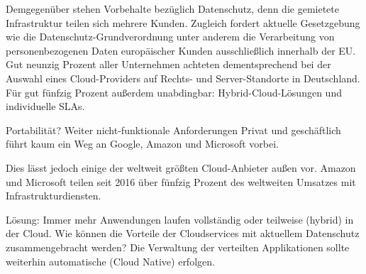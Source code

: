 Demgegenüber stehen Vorbehalte bezüglich Datenschutz, denn die gemietete Infrastruktur teilen sich mehrere Kunden. Zugleich fordert aktuelle Gesetzgebung wie die Datenschutz-Grundverordnung unter anderem die Verarbeitung von personenbezogenen Daten europäischer Kunden ausschließlich innerhalb der EU. %
Gut neunzig Prozent aller Unternehmen achteten dementsprechend bei der Auswahl eines Cloud-Providers auf Rechts- und Server-Standorte in Deutschland. Für gut fünfzig Prozent außerdem unabdingbar: Hybrid-Cloud-Lösungen und individuelle SLAs.

Portabilität? Weiter nicht-funktionale Anforderungen
Privat und geschäftlich führt kaum ein Weg an Google, Amazon und Microsoft vorbei. 


Dies lässt jedoch einige der weltweit größten Cloud-Anbieter außen vor. Amazon und Microsoft teilen seit 2016 über fünfzig Prozent des weltweiten Umsatzes mit Infrastrukturdiensten. %





Lösung: Immer mehr Anwendungen laufen vollständig oder teilweise (hybrid) in der Cloud. Wie können die Vorteile der Cloudservices mit aktuellem Datenschutz zusammengebracht werden? Die Verwaltung der verteilten Applikationen sollte weiterhin automatische (Cloud Native) erfolgen.

